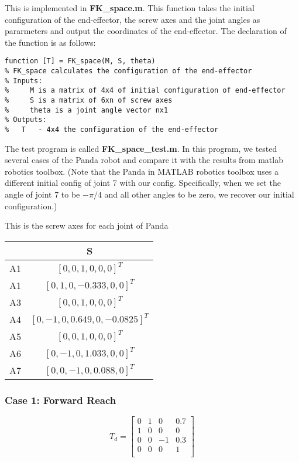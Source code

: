 \documentclass[english,10pt,a4paper]{article}
\begin{document}
	This is implemented in \textbf{FK\_space.m}. This function takes the initial configuration of the end-effector, the screw axes and the joint angles as pararmeters and output the coordinates of the end-effector. The declaration of the function is as follows:
    \begin{lstlisting}[style=matlab]
function [T] = FK_space(M, S, theta)
% FK_space calculates the configuration of the end-effector
% Inputs:
%     M is a matrix of 4x4 of initial configuration of end-effector
%     S is a matrix of 6xn of screw axes
%     theta is a joint angle vector nx1
% Outputs:
%   T   - 4x4 the configuration of the end-effector
    \end{lstlisting}
	
    The test program is called \textbf{FK\_space\_test.m}. In this program, we tested several cases of the Panda robot and compare it with the results from matlab robotics toolbox. (Note that the Panda in MATLAB robotics toolbox uses a different initial config of joint 7 with our config. Specifically, when we set the angle of joint 7 to be $-\pi/4$ and all other angles to be zero, we recover our initial configuration.)
	
    This is the screw axes for each joint of Panda
    \begin{center}
        \begin{tabular}{|c|c|}
            \hline
            &  S \\
            \hline
            A1 & $[0, 0, 1, 0, 0, 0]^{T}$ \\
            \hline
            A1 & $[0, 1, 0, -0.333, 0, 0]^{T}$ \\
            \hline
            A3 & $[0, 0, 1, 0, 0, 0]^{T}$ \\
            \hline
            A4 & $[0, -1, 0, 0.649, 0, -0.0825]^{T}$ \\
            \hline
            A5 & $[0, 0, 1, 0, 0, 0]^{T}$  \\
            \hline
            A6 & $[0, -1, 0, 1.033, 0, 0]^{T}$  \\
            \hline
            A7 & $[0, 0, -1, 0, 0.088, 0]^{T}$ \\
            \hline
        \end{tabular}
    \end{center}
    \subsubsection*{Case 1: Forward Reach}
    $$T_d = \begin{bmatrix}
    	0 & 1 & 0 & 0.7\\
    	1 & 0 & 0 & 0\\
    	0 & 0 & -1 & 0.3 \\
    	0 & 0 & 0 & 1 \\
    \end{bmatrix}$$
    
\end{document}
